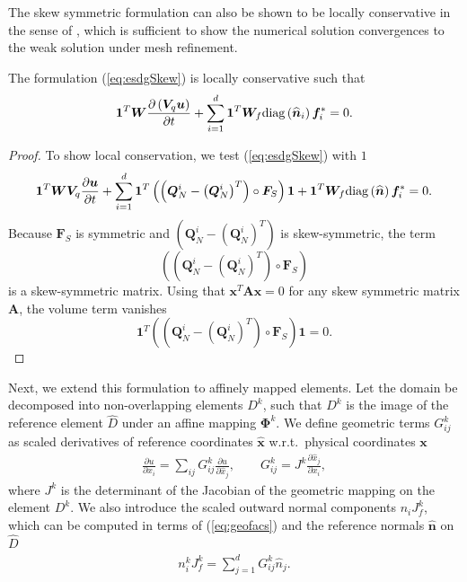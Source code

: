 \documentclass[review]{siamart0216}
\theoremstyle{assumption}
\renewcommand{\hat}[1]{\hat{#1}}
\newcommand{\pd}[2]{\frac{\partial#1}{\partial#2}}
\newcommand{\LRp}[1]{\left( #1 \right)}
\renewcommand{\hat}{\widehat}
\newcommand{\diag}[1]{{\rm diag}\LRp{#1}}
\begin{document}
The skew symmetric formulation can also be shown to be locally conservative in the sense of \cite{shi2017local}, which is sufficient to show the numerical solution convergences to the weak solution under mesh refinement.  
\begin{theorem}
The formulation (\ref{eq:esdgSkew}) is locally conservative such that
\begin{align}
\bm{1}^T\bm{W}\pd{\LRp{\bm{V}_q\bm{u}}}{t} + \sum_{i=1}^d\bm{1}^T\bm{W}_f \diag{\hat{\bm{n}}_i}\bm{f}_i^* = 0. 
\end{align}
\end{theorem}
\begin{proof}
To show local conservation, we test (\ref{eq:esdgSkew}) with $1$
\begin{align}
\bm{1}^T\bm{W}\bm{V}_q\pd{\bm{u}}{t} + \sum_{i=1}^d
\bm{1}^T
\LRp{\LRp{\bm{Q}^i_N - \LRp{\bm{Q}^i_N}^T} \circ \bm{F}_S}\bm{1} + \bm{1}^T\bm{W}_f \diag{\hat{\bm{n}}}\bm{f}_i^* = 0. 
\end{align}
Because $\bm{F}_S$ is symmetric and $\LRp{\bm{Q}^i_N - \LRp{\bm{Q}^i_N}^T}$ is skew-symmetric, the term 
\[
\LRp{\LRp{\bm{Q}^i_N - \LRp{\bm{Q}^i_N}^T} \circ \bm{F}_S}
\]
is a skew-symmetric matrix.  Using that $\bm{x}^T\bm{A}\bm{x} = 0$ for any skew symmetric matrix $\bm{A}$, the volume term vanishes
\[
\bm{1}^T\LRp{\LRp{\bm{Q}^i_N - \LRp{\bm{Q}^i_N}^T} \circ \bm{F}_S}\bm{1} = 0.
\]
\end{proof}

Next, we extend this formulation to affinely mapped elements.  Let the domain be decomposed into non-overlapping elements $D^k$, such that $D^k$ is the image of the reference element $\hat{D}$ under an affine mapping $\bm{\Phi}^k$.  We define geometric terms ${G}^k_{ij}$ as scaled derivatives of reference coordinates $\hat{\bm{x}}$ w.r.t.\ physical coordinates $\bm{x}$
\begin{gather}
\pd{u}{x_i} = \sum_{ij} {G}^k_{ij}\pd{u}{\hat{x}_j}, \qquad {G}^k_{ij} = J^k\pd{\hat{x}_j}{{x}_i}, 
\label{eq:geofacs}
\end{gather}
where $J^k$ is the determinant of the Jacobian of the geometric mapping on the element $D^k$.  We also introduce the scaled outward normal components $n_iJ^k_f$, which can be computed in terms of (\ref{eq:geofacs}) and the reference normals $\hat{\bm{n}}$ on $\hat{D}$
\begin{gather}
n^k_i J^k_f = \sum_{j=1}^d G^k_{ij} \hat{{n}}_j.  
\label{eq:normals}
\end{gather}
 
\end{document}

